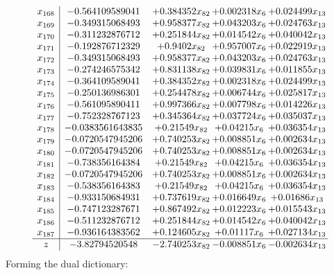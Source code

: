 \documentclass[11pt]{article}
\begin{document}
\[\begin{array}{c| c c@{\hskip 2pt} c@{\hskip 2pt} c@{\hskip 2pt} }
 x_{168}   &  -0.564109589041 & + 0.384352 x_{82} & + 0.002318 x_{6} & + 0.024499 x_{13}\\
 x_{169}   &  -0.349315068493 & + 0.958377 x_{82} & + 0.043203 x_{6} & + 0.024763 x_{13}\\
 x_{170}   &  -0.311232876712 & + 0.251844 x_{82} & + 0.014542 x_{6} & + 0.040042 x_{13}\\
 x_{171}   &  -0.192876712329 & + 0.9402 x_{82} & + 0.957007 x_{6} & + 0.022919 x_{13}\\
 x_{172}   &  -0.349315068493 & + 0.958377 x_{82} & + 0.043203 x_{6} & + 0.024763 x_{13}\\
 x_{173}   &  -0.274246575342 & + 0.831138 x_{82} & + 0.039831 x_{6} & + 0.011855 x_{13}\\
 x_{174}   &  -0.364109589041 & + 0.384352 x_{82} & + 0.002318 x_{6} & + 0.024499 x_{13}\\
 x_{175}   &  -0.250136986301 & + 0.254478 x_{82} & + 0.006744 x_{6} & + 0.025817 x_{13}\\
 x_{176}   &  -0.561095890411 & + 0.997366 x_{82} & + 0.007798 x_{6} & + 0.014226 x_{13}\\
 x_{177}   &  -0.752328767123 & + 0.345364 x_{82} & + 0.037724 x_{6} & + 0.035037 x_{13}\\
 x_{178}   &  -0.0383561643835 & + 0.21549 x_{82} & + 0.04215 x_{6} & + 0.036354 x_{13}\\
 x_{179}   &  -0.0720547945206 & + 0.740253 x_{82} & + 0.008851 x_{6} & + 0.002634 x_{13}\\
 x_{180}   &  -0.0720547945206 & + 0.740253 x_{82} & + 0.008851 x_{6} & + 0.002634 x_{13}\\
 x_{181}   &  -0.738356164384 & + 0.21549 x_{82} & + 0.04215 x_{6} & + 0.036354 x_{13}\\
 x_{182}   &  -0.0720547945206 & + 0.740253 x_{82} & + 0.008851 x_{6} & + 0.002634 x_{13}\\
 x_{183}   &  -0.538356164383 & + 0.21549 x_{82} & + 0.04215 x_{6} & + 0.036354 x_{13}\\
 x_{184}   &  -0.933150684931 & + 0.737619 x_{82} & + 0.016649 x_{6} & + 0.01686 x_{13}\\
 x_{185}   &  -0.747123287671 & + 0.867492 x_{82} & + 0.012223 x_{6} & + 0.015543 x_{13}\\
 x_{186}   &  -0.511232876712 & + 0.251844 x_{82} & + 0.014542 x_{6} & + 0.040042 x_{13}\\
 x_{187}   &  -0.936164383562 & + 0.124605 x_{82} & + 0.01117 x_{6} & + 0.027134 x_{13}\\
\hline
z    &  -3.82794520548 & -2.740253 x_{82} & -0.008851 x_{6} & -0.002634 x_{13}\\
\end{array}\]
Forming the dual dictionary:
\end{document}
